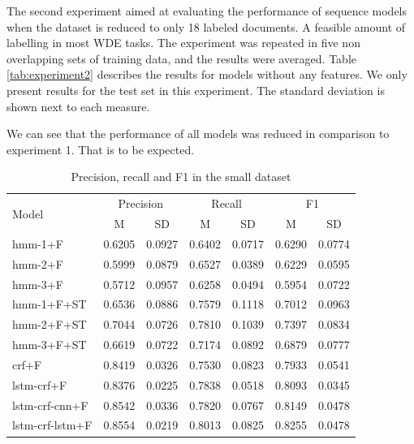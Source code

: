 \documentclass[sigconf]{acmart}
\begin{document}
The second experiment aimed at evaluating the performance of sequence models
when the dataset is reduced to only 18 labeled documents. A feasible amount of 
labelling in most WDE tasks. The experiment was repeated in five non overlapping 
sets of training data, and the results were averaged. Table \ref{tab:experiment2} 
describes the results for models without any features. We only present results
for the test set in this experiment. The standard deviation is shown next to each
measure.

We can see that the performance of all models was reduced in comparison 
to experiment 1. That is to be expected.

\begin{table}[h]
  \small
  \begin{center}
    \begin{tabular}{lllllll}
      \toprule
      \multirow{2}{*}{Model} & \multicolumn{2}{c}{Precision} & \multicolumn{2}{c}{Recall} & \multicolumn{2}{c}{F1} \\
                             & \multicolumn{1}{c}{\tiny{M}} & \multicolumn{1}{c}{\tiny{SD}}
			     & \multicolumn{1}{c}{\tiny{M}} & \multicolumn{1}{c}{\tiny{SD}}
			     & \multicolumn{1}{c}{\tiny{M}} & \multicolumn{1}{c}{\tiny{SD}} \\
      \midrule
      hmm-1+F	      & 0.6205 & 0.0927 & 0.6402 & 0.0717 & 0.6290 & 0.0774 \\
      hmm-2+F	      & 0.5999 & 0.0879 & 0.6527 & 0.0389 & 0.6229 & 0.0595 \\
      hmm-3+F	      & 0.5712 & 0.0957 & 0.6258 & 0.0494 & 0.5954 & 0.0722 \\
      hmm-1+F+ST      & 0.6536 & 0.0886 & 0.7579 & 0.1118 & 0.7012 & 0.0963 \\
      hmm-2+F+ST      & 0.7044 & 0.0726 & 0.7810 & 0.1039 & 0.7397 & 0.0834 \\
      hmm-3+F+ST      & 0.6619 & 0.0722 & 0.7174 & 0.0892 & 0.6879 & 0.0777 \\
      crf+F	      & 0.8419 & 0.0326 & 0.7530 & 0.0823 & 0.7933 & 0.0541 \\
      lstm-crf+F      & 0.8376 & 0.0225 & 0.7838 & 0.0518 & 0.8093 & 0.0345 \\
      lstm-crf-cnn+F  & 0.8542 & 0.0336 & 0.7820 & 0.0767 & 0.8149 & 0.0478 \\
      lstm-crf-lstm+F & 0.8554 & 0.0219 & 0.8013 & 0.0825 & 0.8255 & 0.0478 \\
      \bottomrule
    \end{tabular}
  \end{center}
  \caption{Precision, recall and F1 in the small dataset}
  \label{tab:experiment2f}
\end{table}
\end{document}

